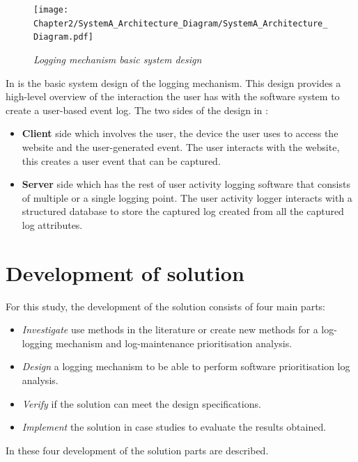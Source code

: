  \clearpage

 \begin{figure}[!htb]
	 \centering %
	 \texttt{[image: Chapter2/SystemA\_Architecture\_Diagram/SystemA\_Architecture\_Diagram.pdf]}
	 \caption[Logging mechanism basic system design]
	 {\textit{Logging mechanism basic system design}}\label{fig:ch2_systemDesign}
 \end{figure}
 
 In  is the basic system design of the logging mechanism. This design provides a high-level overview of the interaction the user has with the software system to create a user-based event log. The two sides of the design in :
 
 \begin{itemize}
	 \item \textbf{Client} side which involves the user, the device the user uses to access the website and the user-generated event. The user interacts with the website, this creates a user event that can be captured. 
	 \item \textbf{Server} side which has the rest of user activity logging software that consists of multiple or a single logging point. The user activity logger interacts with a structured database to store the captured log created from all the captured log attributes.
 \end{itemize}

\section{Development of solution}\label{sec:ch2_developementOfSolution}
For this study, the development of the solution consists of four main parts:

\begin{itemize}
	\item \textit{Investigate} use methods in the literature or create new methods for a log-logging mechanism and log-maintenance prioritisation analysis.
	\item \textit{Design} a logging mechanism to be able to perform software prioritisation log analysis.
	\item \textit{Verify} if the solution can meet the design specifications.
	\item \textit{Implement} the solution in case studies to evaluate the results obtained.
\end{itemize}

In  these four development of the solution parts are described.

